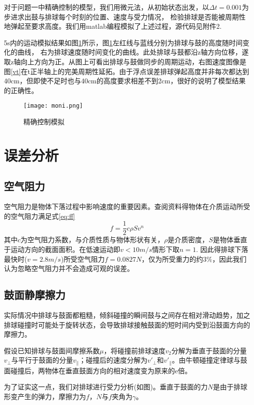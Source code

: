 \documentclass[withoutpreface,bwprint]{cumcmthesis} %
\begin{document}
对于问题一中精确控制的模型，我们用微元法，从初始状态出发，以$\Delta t=0.001$为步进求出鼓与排球每个时刻的位置、速度与受力情况，
检验排球是否能被周期性地弹起至要求高度。我们用matlab编程模拟了上述过程，源代码见附件2.

5s内的运动模拟结果如图\ref{fig:moni}所示，图\ref{fig:moni}左红线与蓝线分别为排球与鼓的高度随时间变化的曲线，
右为排球速度随时间变化的曲线。此处排球与鼓都沿z轴方向位移，遂取z轴向上方向为正。从图上可看出排球与鼓做同步的周期运动，右图速度图像是图\ref{vt}在t正半轴上的完美周期性延拓。由于浮点误差排球弹起高度并非每次都达到40cm，但即使不足时也与40cm的高度要求相差不到2cm，很好的说明了模型结果的正确性。

\begin{figure}[h]
	\centering
	\texttt{[image: moni.png]}
	\caption{精确控制模拟}
	\label{fig:moni}
\end{figure}

\section{误差分析}

\subsection{空气阻力}
空气阻力是物体下落过程中影响速度的重要因素。查阅资料得物体在介质运动所受的空气阻力满足式\ref{eq:ff}
\begin{equation}
	f=\frac{1}{2}c\rho Sv^n
	\label{eq:ff}
\end{equation}
其中$c$为空气阻力系数，与介质性质与物体形状有关，$\rho$是介质密度，$S$是物体垂直于运动方向的截面面积。在低速运动即$v<10m/s$情形下取$n=1$. 因此得排球下落最快时($v=2.8m/s$)所受空气阻力$f=0.0827N$，仅为所受重力的约$3\%$，因此我们认为忽略空气阻力并不会造成可观的误差。

\subsection{鼓面静摩擦力}
实际情况中排球与鼓面都粗糙，倾斜碰撞的瞬间鼓与之间存在相对滑动趋势，加之排球碰撞时可能处于旋转状态，会导致排球接触鼓面的短时间内受到沿鼓面方向的摩擦力。

假设已知排球与鼓面间摩擦系数$\mu$，将碰撞前排球速度$v_2$分解为垂直于鼓面的分量$v_\bot$与平行于鼓面的分量$v_\parallel$；碰撞后的速度分解为$v'_\bot$和$v'_\parallel$。由牛顿碰撞定律球与鼓面碰撞后，两物体在垂直鼓面方向的相对速度变为原来的e倍。

为了证实这一点，我们对排球进行受力分析(如图)。垂直于鼓面的力$N$是由于排球形变产生的弹力，摩擦力为$f$，$N$与$f$夹角为$\gamma$。
\end{document}
